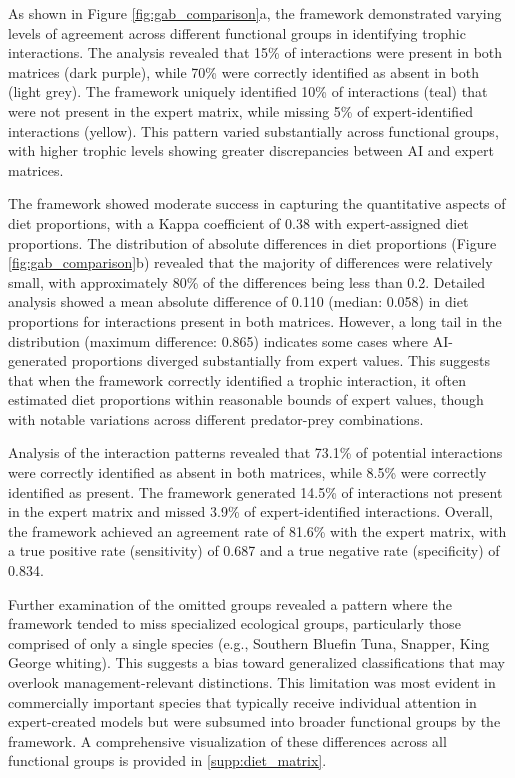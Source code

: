 As shown in Figure \ref{fig:gab_comparison}a, the framework demonstrated varying levels of agreement across different functional groups in identifying trophic interactions. The analysis revealed that 15\% of interactions were present in both matrices (dark purple), while 70\% were correctly identified as absent in both (light grey). The framework uniquely identified 10\% of interactions (teal) that were not present in the expert matrix, while missing 5\% of expert-identified interactions (yellow). This pattern varied substantially across functional groups, with higher trophic levels showing greater discrepancies between AI and expert matrices.

The framework showed moderate success in capturing the quantitative aspects of diet proportions, with a Kappa coefficient of 0.38 with expert-assigned diet proportions. The distribution of absolute differences in diet proportions (Figure \ref{fig:gab_comparison}b) revealed that the majority of differences were relatively small, with approximately 80\% of the differences being less than 0.2. Detailed analysis showed a mean absolute difference of 0.110 (median: 0.058) in diet proportions for interactions present in both matrices. However, a long tail in the distribution (maximum difference: 0.865) indicates some cases where AI-generated proportions diverged substantially from expert values. This suggests that when the framework correctly identified a trophic interaction, it often estimated diet proportions within reasonable bounds of expert values, though with notable variations across different predator-prey combinations.

Analysis of the interaction patterns revealed that 73.1\% of potential interactions were correctly identified as absent in both matrices, while 8.5\% were correctly identified as present. The framework generated 14.5\% of interactions not present in the expert matrix and missed 3.9\% of expert-identified interactions. Overall, the framework achieved an agreement rate of 81.6\% with the expert matrix, with a true positive rate (sensitivity) of 0.687 and a true negative rate (specificity) of 0.834. 

Further examination of the omitted groups revealed a pattern where the framework tended to miss specialized ecological groups, particularly those comprised of only a single species (e.g., Southern Bluefin Tuna, Snapper, King George whiting). This suggests a bias toward generalized classifications that may overlook management-relevant distinctions. This limitation was most evident in commercially important species that typically receive individual attention in expert-created models but were subsumed into broader functional groups by the framework. A comprehensive visualization of these differences across all functional groups is provided in \ref{supp:diet_matrix}.

